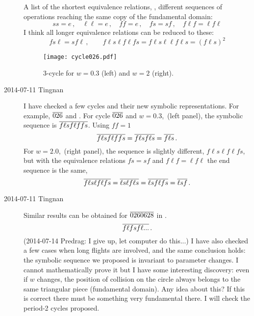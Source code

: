 \begin{description}
A list of the shortest
equivalence relations, \ie, different sequences of operations reaching
the same copy of the fundamental domain:
\[
s s = e
\,,\quad
\ell \ell = e
\,,\quad
f f = e
\,,\quad
f s = s f
\,,\quad
f \ell f=\ell f \ell
\]
I think all longer equivalence relations can be reduced to these:
\[
f s \ell = s f \ell
\,,\qquad
      f \ell s \ell f \ell f s
    = f \ell s \ell \ell f \ell s
    = (f \ell s)^2
\]

\begin{figure}
\texttt{[image: cycle026.pdf]}
\caption{3-cycle  for $w=0.3$ (left) and $w=2$ (right). }
\label{fig:cycle026}
\end{figure}

\item[2014-07-11 Tingnan]
I have checked a few cycles and their new symbolic representations. For
example, ${\overline{026}}$ and . For cycle ${\overline{026}}$ and
$w=0.3$, \,(left panel),
the symbolic sequence is ${\overline{f\ell sf\ell f fs}}$.
Using $f f = 1$
\[
{\overline{f\ell sf\ell f fs}}
    = {\overline{f\ell sf\ell s}}
    = {\overline{f\ell s}}
\,.
\]
For $w=2.0$, \,(right panel), the
sequence is slightly different, $f\ell s\ell f \ell fs$, but with the
equivalence relations
$f s = s f$ and $f \ell f = \ell f \ell$ the end sequence is the
same,
\[
{\overline{f\ell s\ell f \ell fs}}
    = {\overline{\ell s\ell f \ell s}}
    = {\overline{\ell s f \ell f s}}
    = {\overline{\ell s f}}
\,.
\]

\item[2014-07-11 Tingnan]
Similar results can be obtained for ${\overline{0260628}}$ in
.
\[
{\overline{f \ell f s f \ell ...}}
\,.
\]
(2014-07-14 Predrag: I give up, let computer do this...)
I have also
checked a few cases when long flights are involved, and the same
conclusion holds: the symbolic sequence we proposed is invariant to
parameter changes. I cannot mathematically prove it but I have some
interesting discovery: even if $w$ changes, the position of collision on
the circle always belongs to the same triangular piece (fundamental
domain). Any idea about this? If this is correct there must be something
very fundamental there. I will check the period-2 cycles proposed.


\end{description}
